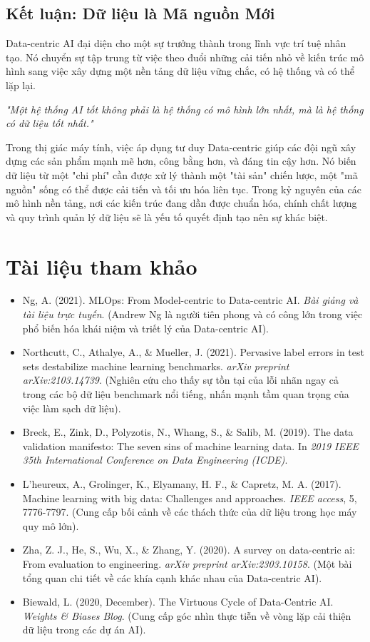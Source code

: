 \subsection{Kết luận: Dữ liệu là Mã nguồn Mới}
\label{subsec:data_centric_conclusion}
Data-centric AI đại diện cho một sự trưởng thành trong lĩnh vực trí tuệ nhân tạo. Nó chuyển sự tập trung từ việc theo đuổi những cải tiến nhỏ về kiến trúc mô hình sang việc xây dựng một nền tảng dữ liệu vững chắc, có hệ thống và có thể lặp lại.
\begin{center}
	\textit{"Một hệ thống AI tốt không phải là hệ thống có mô hình lớn nhất, mà là hệ thống có dữ liệu tốt nhất."}
\end{center}
Trong thị giác máy tính, việc áp dụng tư duy Data-centric giúp các đội ngũ xây dựng các sản phẩm mạnh mẽ hơn, công bằng hơn, và đáng tin cậy hơn. Nó biến dữ liệu từ một "chi phí" cần được xử lý thành một "tài sản" chiến lược, một "mã nguồn" sống có thể được cải tiến và tối ưu hóa liên tục. Trong kỷ nguyên của các mô hình nền tảng, nơi các kiến trúc đang dần được chuẩn hóa, chính chất lượng và quy trình quản lý dữ liệu sẽ là yếu tố quyết định tạo nên sự khác biệt.

\section*{Tài liệu tham khảo}
\begin{itemize}
	\item[1] Ng, A. (2021). MLOps: From Model-centric to Data-centric AI. \textit{Bài giảng và tài liệu trực tuyến}. (Andrew Ng là người tiên phong và có công lớn trong việc phổ biến hóa khái niệm và triết lý của Data-centric AI).
	\item[2] Northcutt, C., Athalye, A., \& Mueller, J. (2021). Pervasive label errors in test sets destabilize machine learning benchmarks. \textit{arXiv preprint arXiv:2103.14739}. (Nghiên cứu cho thấy sự tồn tại của lỗi nhãn ngay cả trong các bộ dữ liệu benchmark nổi tiếng, nhấn mạnh tầm quan trọng của việc làm sạch dữ liệu).
	\item[3] Breck, E., Zink, D., Polyzotis, N., Whang, S., \& Salib, M. (2019). The data validation manifesto: The seven sins of machine learning data. In \textit{2019 IEEE 35th International Conference on Data Engineering (ICDE)}.
	\item[4] L'heureux, A., Grolinger, K., Elyamany, H. F., \& Capretz, M. A. (2017). Machine learning with big data: Challenges and approaches. \textit{IEEE access}, 5, 7776-7797. (Cung cấp bối cảnh về các thách thức của dữ liệu trong học máy quy mô lớn).
	\item[5] Zha, Z. J., He, S., Wu, X., \& Zhang, Y. (2020). A survey on data-centric ai: From evaluation to engineering. \textit{arXiv preprint arXiv:2303.10158}. (Một bài tổng quan chi tiết về các khía cạnh khác nhau của Data-centric AI).
	\item[6] Biewald, L. (2020, December). The Virtuous Cycle of Data-Centric AI. \textit{Weights \& Biases Blog}. (Cung cấp góc nhìn thực tiễn về vòng lặp cải thiện dữ liệu trong các dự án AI).
\end{itemize}